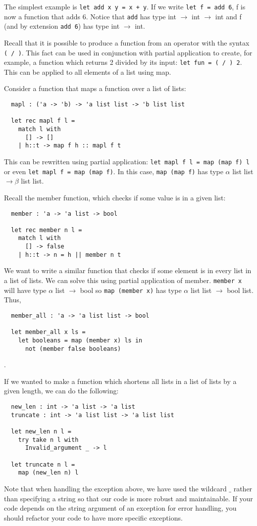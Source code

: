 \documentclass[12pt]{article}
\begin{document}
The simplest example is \texttt{let add x y = x + y}. If we write \texttt{let f = add 6}, f is now a function that
adds 6. Notice that \texttt{add} has type int $\rightarrow$ int $\rightarrow$ int and f (and by extension \texttt{add 6}) has type int $\rightarrow$ int.

Recall that it is possible to produce a function from an operator with the syntax \texttt{( / )}. This fact can be
used in conjunction with partial application to create, for example, a function which returns 2 divided by its input:
\texttt{let fun = ( / ) 2}. This can be applied to all elements of a list using map.

Consider a function that maps a function over a list of lists:
\begin{lstlisting}
  mapl : ('a -> 'b) -> 'a list list -> 'b list list

  let rec mapl f l =
    match l with
      [] -> []
    | h::t -> map f h :: mapl f t
\end{lstlisting}
This can be rewritten using partial application: \texttt{let mapl f l = map (map f) l} or even \texttt{let
mapl f = map (map f)}. In this case, \texttt{map (map f)} has type $\alpha$ list list $\rightarrow \beta$ list list.

Recall the member function, which checks if some value is in a given list:
\begin{lstlisting}
  member : 'a -> 'a list -> bool

  let rec member n l =
    match l with
      [] -> false
    | h::t -> n = h || member n t
\end{lstlisting}
We want to write a similar function that checks if some element is in every list in a list of lists.
We can solve this using partial application of member. \texttt{member x} will have type $\alpha$ list $\rightarrow$ bool
so \texttt{map (member x)} has type $\alpha$ list list $\rightarrow$ bool list. Thus,
\begin{lstlisting}
  member_all : 'a -> 'a list list -> bool

  let member_all x ls =
    let booleans = map (member x) ls in
      not (member false booleans)
\end{lstlisting}.

If we wanted to make a function which shortens all lists in a list of lists by a given length, we can do the following:
\begin{lstlisting}
  new_len : int -> 'a list -> 'a list
  truncate : int -> 'a list list -> 'a list list

  let new_len n l =
    try take n l with
      Invalid_argument _ -> l

  let truncate n l =
    map (new_len n) l
\end{lstlisting}
Note that when handling the exception above, we have used the wildcard $\_$ rather than specifying a string so that
our code is more robust and maintainable. If your code depends on the string argument of an exception for error handling,
you should refactor your code to have more specific exceptions.
\end{document}
